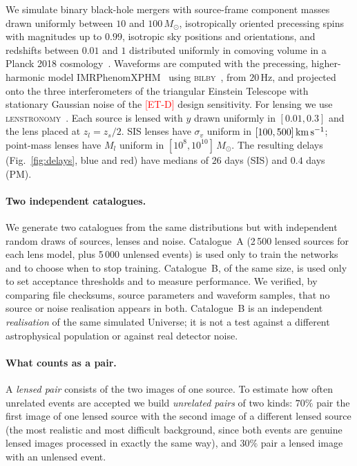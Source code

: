 \documentclass[aps,prd,twocolumn,superscriptaddress,nofootinbib,floatfix]{revtex4-2}
\newcommand{\TBD}[1]{\textcolor{red}{[#1]}}
\newcommand{\msun}{M_\odot}
\begin{document}
We simulate binary black-hole mergers with source-frame component masses drawn uniformly between $10$ and $100\,\msun$, isotropically oriented precessing spins with magnitudes up to $0.99$, isotropic sky positions and orientations, and redshifts between $0.01$ and $1$ distributed uniformly in comoving volume in a Planck 2018 cosmology~\cite{Planck2018}.
Waveforms are computed with the precessing, higher-harmonic model IMRPhenomXPHM~\cite{XPHM} using \textsc{bilby}~\cite{bilby}, from $20$\,Hz, and projected onto the three interferometers of the triangular Einstein Telescope with stationary Gaussian noise of the \TBD{ET-D} design sensitivity.
For lensing we use \textsc{lenstronomy}~\cite{lenstronomy}.
Each source is lensed with $y$ drawn uniformly in $[0.01,0.3]$ and the lens placed at $z_l=z_s/2$.
SIS lenses have $\sigma_v$ uniform in $[100,500]\,{\rm km\,s^{-1}}$; point-mass lenses have $M_l$ uniform in $[10^{8},10^{10}]\,\msun$.
The resulting delays (Fig.~\ref{fig:delays}, blue and red) have medians of $26$ days (SIS) and $0.4$ days (PM).

\paragraph*{Two independent catalogues.}
We generate two catalogues from the same distributions but with independent random draws of sources, lenses and noise.
Catalogue~A (2\,500 lensed sources for each lens model, plus 5\,000 unlensed events) is used only to train the networks and to choose when to stop training.
Catalogue~B, of the same size, is used only to set acceptance thresholds and to measure performance.
We verified, by comparing file checksums, source parameters and waveform samples, that no source or noise realisation appears in both.
Catalogue~B is an independent \emph{realisation} of the same simulated Universe; it is not a test against a different astrophysical population or against real detector noise.

\paragraph*{What counts as a pair.}
A \emph{lensed pair} consists of the two images of one source.
To estimate how often unrelated events are accepted we build \emph{unrelated pairs} of two kinds: $70\%$ pair the first image of one lensed source with the second image of a different lensed source (the most realistic and most difficult background, since both events are genuine lensed images processed in exactly the same way), and $30\%$ pair a lensed image with an unlensed event.
\end{document}
